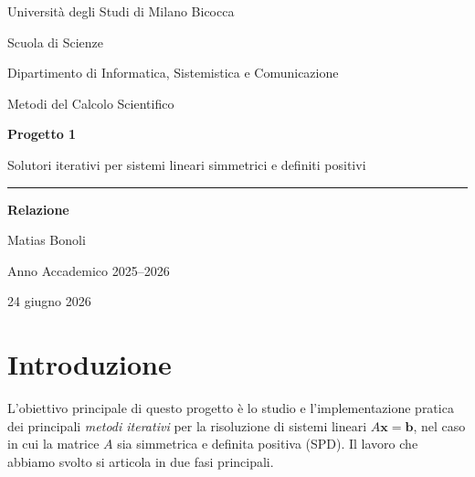 \documentclass[11pt,a4paper]{article}
\begin{document}
\begin{titlepage}
\centering
\vspace*{2cm}

{\large Università degli Studi di Milano Bicocca\par}
{\large Scuola di Scienze\par}
{\large Dipartimento di Informatica, Sistemistica e Comunicazione\par}
\vspace{0.8cm}
{\large Metodi del Calcolo Scientifico\par}

\vspace{2.2cm}
{\Huge\bfseries Progetto 1\par}
\vspace{0.6cm}
{\Large Solutori iterativi per sistemi lineari simmetrici e definiti positivi\par}

\vspace{2.2cm}
\rule{0.55\textwidth}{0.4pt}\par
\vspace{0.6cm}
{\large\bfseries Relazione\par}
\vspace{0.6cm}

\vspace{1.6cm}
{\large Matias Bonoli\par}

\vfill
{\large Anno Accademico 2025--2026\par}
\vspace{0.3cm}
{\large 24 giugno 2026\par}
\end{titlepage}

\tableofcontents
\newpage

\section{Introduzione}
L'obiettivo principale di questo progetto è lo studio e l'implementazione pratica
dei principali \emph{metodi iterativi} per la risoluzione di sistemi lineari
$A\mathbf{x}=\mathbf{b}$, nel caso in cui la matrice $A$ sia simmetrica e definita
positiva (SPD). Il lavoro che abbiamo svolto si articola in due fasi principali.
\end{document}
